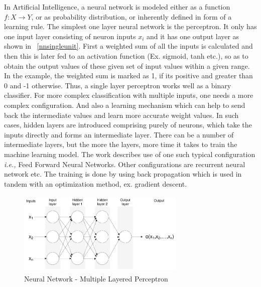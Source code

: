 In Artificial Intelligence,  a neural network is modeled either as a function $f:X\rightarrow Y$, or as probability distribution, or inherently defined in form of a learning rule. The simplest one layer neural network is the perceptron. It only has one input layer consisting of neuron inputs $x_i$ and it has one output layer as shown in ~\autoref{nnsingleunit}. First a weighted sum of all the inputs is calculated and then this is later fed to an activation function (Ex. sigmoid, tanh etc.), so as to obtain the output values of these given set of input values within a given range. In the example, the weighted sum is marked as 1, if its positive and greater than 0 and -1 otherwise. Thus, a single layer perceptron works well as a binary classifier. For more complex classification with multiple inputs, one needs a more complex configuration. And also a learning mechanism which can help to send back the intermediate values and learn more accurate weight values. In such cases, hidden layers are introduced comprising purely of neurons, which take the inputs directly and forms an intermediate layer. There can be a number of intermediate layers, but the more the layers, more time it takes to train the machine learning model. The work describes use of one such typical configuration \textit{i.e.,} Feed Forward Neural Networks. Other configurations are recurrent neural network etc. The training is done by using back propagation which is used in tandem with an optimization method, ex. gradient descent. 

\begin{figure}[ht!]
	\centering
		\includegraphics[height=40mm,  width=80mm]{figures/3_multipercep.jpg}
		\caption[Neural Network - Multiple Layered Perceptron]{Neural Network - Multiple Layered Perceptron \footnotemark}
			\label{multipercep}
\end{figure}


